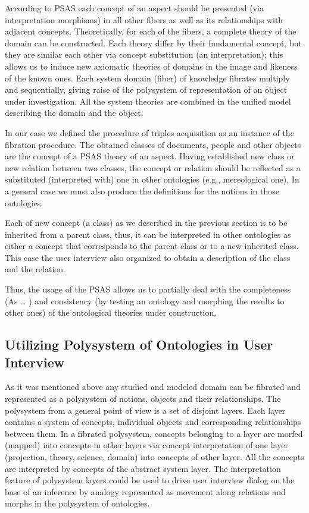 \documentclass[utf8]{../IncArticle}
\begin{document}
According to PSAS \cite{father} each concept of an aspect should be presented (via interpretation morphisms) in all other fibers as well as its relationships with adjacent concepts. Theoretically, for each of the fibers, a complete theory of the domain can be constructed. Each theory differ by their fundamental concept, but they are similar each other via concept substitution (an interpretation); this allows us to induce new axiomatic theories of domains in the image and likeness of the known ones. Each system domain (fiber) of knowledge fibrates multiply and sequentially, giving raise of the polysystem of representation of an object under investigation. All the system theories are combined in the unified model describing the domain and the object.

In our case we defined the procedure of triples acquisition as an instance of the fibration procedure. The obtained classes of documents, people and other objects are the concept of a PSAS theory of an aspect. Having established new class or new relation between two classes, the concept or relation should be reflected as a substituted (interpreted with) one in other ontologies (e.g., mereological one). In a general case we must also produce the definitions for the notions in those ontologies.

Each of new concept (a class) as we described in the previous section
is to be inherited from a parent class, thus, it can be interpreted in
other ontologies as either a concept that corresponds to the parent
class or to a new inherited class. This case the user interview also
organized to obtain a description of the class and the relation.

Thus, the usage of the PSAS allows us to partially deal with the
completeness (As \ldots{} \cite{sergey}) and consistency (by testing
an ontology and morphing the results to other ones) of the ontological
theories under construction.

\subsection{Utilizing Polysystem of Ontologies in User Interview}
As it was mentioned above any studied and modeled domain can be fibrated and represented as a polysystem of notions, objects and their relationships. The polysystem from a general point of view is a set of disjoint layers. Each layer contains a system of concepts, individual objects and corresponding relationships between them. In a fibrated polysystem, concepts belonging to a layer are morfed (mapped) into concepts in other layers via concept interpretation of one layer (projection, theory, science, domain) into concepts of other layer. All the concepts are interpreted by concepts of the abstract system layer. The interpretation feature of polysystem layers could be used to drive user interview dialog on the base of an inference by analogy represented as movement along relations and morphs in the polysystem of ontologies.
\end{document}
